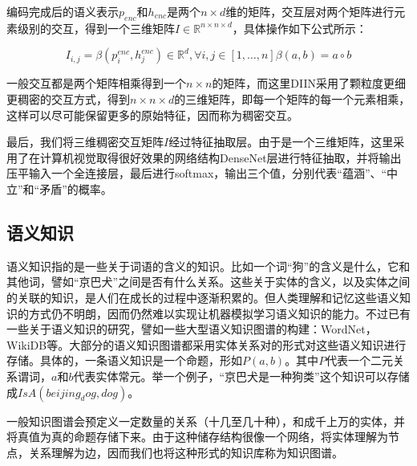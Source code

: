 \documentclass[UTF8,11pt,a4paper,nofonts]{ctexart}
\begin{document}
编码完成后的语义表示$p_{enc}$和$h_{enc}$是两个$n\times d$维的矩阵，交互层对两个矩阵进行元素级别的交互，得到一个三维矩阵$I \in \mathbb{R}^{n\times n \times d}$，具体操作如下公式所示：

\begin{equation}
I_{i,j} = \beta(p^{enc}_i, h^{enc}_j) \in \mathbb{R}^d, \forall i, j \in [1,\dots,n]

\beta(a, b) = a \circ b
\end{equation}

一般交互都是两个矩阵相乘得到一个$n\times n$的矩阵，而这里DIIN采用了颗粒度更细更稠密的交互方式，得到$n\times n \times d$的三维矩阵，即每一个矩阵的每一个元素相乘，这样可以尽可能保留更多的原始特征，因而称为稠密交互。

最后，我们将三维稠密交互矩阵$I$经过特征抽取层。由于是一个三维矩阵，这里采用了在计算机视觉取得很好效果的网络结构DenseNet层\cite{}进行特征抽取，并将输出压平输入一个全连接层，最后进行softmax，输出三个值，分别代表“蕴涵”、“中立”和“矛盾”的概率。



\subsection{语义知识}
语义知识指的是一些关于词语的含义的知识。比如一个词“狗”的含义是什么，它和其他词，譬如“京巴犬”之间是否有什么关系。这些关于实体的含义，以及实体之间的关联的知识，是人们在成长的过程中逐渐积累的。但人类理解和记忆这些语义知识的方式仍不明朗，因而仍然难以实现让机器模拟学习语义知识的能力。不过已有一些关于语义知识的研究，譬如一些大型语义知识图谱的构建：WordNet，WikiDB等。大部分的语义知识图谱都采用实体关系对的形式对这些语义知识进行存储。具体的，一条语义知识是一个命题，形如$P(a, b)$。其中$P$代表一个二元关系谓词，$a$和$b$代表实体常元。举一个例子，“京巴犬是一种狗类”这个知识可以存储成$IsA(beijing_dog, dog)$。

一般知识图谱会预定义一定数量的关系（十几至几十种），和成千上万的实体，并将真值为真的命题存储下来。由于这种储存结构很像一个网络，将实体理解为节点，关系理解为边，因而我们也将这种形式的知识库称为知识图谱。
\end{document}
